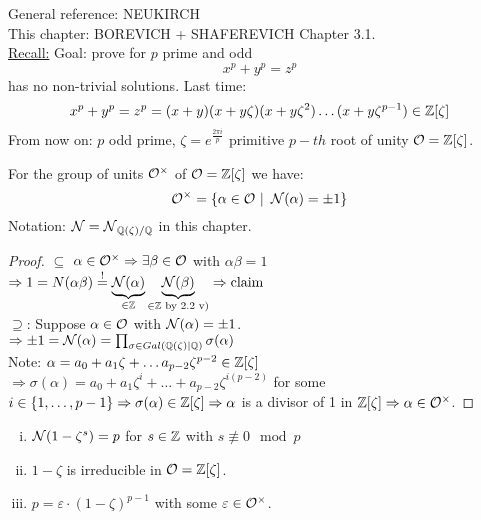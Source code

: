 General reference: NEUKIRCH\\
This chapter: BOREVICH + SHAFEREVICH Chapter 3.1.\\

\underline{Recall:} Goal: prove for $p$ prime and odd 
\[x^p+y^p=z^p\]
has no non-trivial solutions.
Last time:
\[x^p+y^p=z^p=(x+y)(x+y\zeta)(x+y\zeta^2)\dots (x+y\zeta^{p-1}) \in \mathbb{Z}[\zeta]\]
From now on: $p$ odd prime, $\zeta = e^{\frac{2\pi i}{p}}$ primitive $p-th$ root of unity $\mathcal{O}= \mathbb{Z}[\zeta]$.

\begin{Prop}
For the group of units $\mathcal{O}^\times$ of $\mathcal{O}=\mathbb{Z}[\zeta]$ we have:
\[ \mathcal{O}^\times = \{ \alpha \in \mathcal{O} \ | \ \operatorname{\mathcal{N}}(\alpha) = \pm 1\}\]
Notation: $\operatorname{\mathcal{N}}=\operatorname{\mathcal{N}}_{\mathbb{Q}(\zeta) / \mathbb{Q}}$ in this chapter.
\end{Prop}
\begin{proof}
\glqq $\subseteq$ \grqq $\alpha \in \mathcal{O}^\times \Rightarrow \exists \beta \in \mathcal{O}$ with $\alpha\beta=1$
$\Rightarrow 1 = N(\alpha\beta) \stackrel{!}{=} \underbrace{\operatorname{\mathcal{N}}(\alpha)}_{\in \mathbb{Z}} \underbrace{\operatorname{\mathcal{N}}(\beta)}_{\in \mathbb{Z} \text{ by 2.2 v)}} \Rightarrow \text{claim}$\\
\glqq $\supseteq$\grqq: Suppose $\alpha \in \mathcal{O}$ with $\operatorname{\mathcal{N}}(\alpha) = \pm 1$.\\
$\Rightarrow \pm 1 = \operatorname{\mathcal{N}}(\alpha) = \prod_{\sigma \in Gal(\mathbb{Q}(\zeta)| \mathbb{Q})} \sigma(\alpha)$\\
Note: $\alpha = a_0 + a_1 \zeta + \dots a_{p-2} \zeta^{p-2} \in \mathbb{Z}[\zeta]$\\
$\Rightarrow \sigma(\alpha)=a_0+a_1\zeta^i + \dots + a_{p-2}\zeta^{i(p-2)}$ for some $i \in \{1, \dots, p-1\} \Rightarrow \sigma(\alpha) \in \mathbb{Z}[\zeta] \\
\Rightarrow \alpha$ is a divisor of 1 in $\mathbb{Z}[\zeta] \Rightarrow \alpha \in \mathcal{O}^\times$.
\end{proof}

\begin{Lem}
\begin{enumerate}[i)]
\item $\operatorname{\mathcal{N}}(1-\zeta^s) = p$ for $s \in \mathbb{Z}$ with $s \not\equiv 0 \mod p$
\item $1- \zeta$ is irreducible in $\mathcal{O}=\mathbb{Z}[\zeta]$.
\item $p= \varepsilon \cdot(1-\zeta)^{p-1}$ with some $\varepsilon \in \mathcal{O}^\times$.
\end{enumerate}
\end{Lem}

